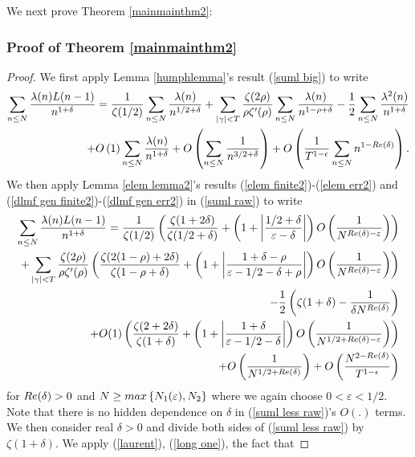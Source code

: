 \documentclass[11pt,article]{amsart}
\numberwithin{equation}{section}
\numberwithin{equation}{section}
\numberwithin{lemma}{section}
\numberwithin{prop}{section}
\begin{document}
We next prove Theorem \ref{mainmainthm2}:

\subsubsection{Proof of Theorem \ref{mainmainthm2}}
\begin{proof}
We first apply Lemma \ref{humphlemma}'s result (\ref{suml big}) to write
\begin{align}
\sum_{n\leq N}\frac{\lambda(n)L(n-1)}{n^{1+\delta}}=\frac{1}{\zeta(1/2)}\sum_{n\leq N}\frac{\lambda(n)}{n^{1/2+\delta}}+\sum_{\left|\gamma\right|<T}\frac{\zeta(2\rho)}{\rho\zeta'(\rho)}\sum_{n\leq N}\frac{\lambda(n)}{n^{1-\rho+\delta}}-\frac{1}{2}\sum_{n\leq N}\frac{\lambda^{2}(n)}{n^{1+\delta}} \nonumber \\
+O\left(1\right)\sum_{n\leq N}\frac{\lambda(n)}{n^{1+\delta}}+O\left(\sum_{n\leq N}\frac{1}{n^{3/2+\delta}}\right)+O\left(\frac{1}{T^{1-\epsilon}}\sum_{n\leq N}n^{1-\textnormal{Re}(\delta)}\right). \label{suml raw}
\end{align}
We then apply Lemma \ref{elem lemma2}'s results (\ref{elem finite2})-(\ref{elem err2}) and (\ref{dlmf gen finite2})-(\ref{dlmf gen err2}) in (\ref{suml raw}) to write
\begin{align}
\sum_{n\leq N}\frac{\lambda(n)L(n-1)}{n^{1+\delta}}=\frac{1}{\zeta(1/2)}\left(\frac{\zeta(1+2\delta)}{\zeta(1/2+\delta)}+\left(1+\left|\frac{1/2+\delta}{\varepsilon-\delta}\right|\right)O\left(\frac{1}{N^{\textnormal{Re}(\delta)-\varepsilon}}\right)\right) \nonumber \\ +\sum_{\left|\gamma\right|<T}\frac{\zeta(2\rho)}{\rho\zeta'(\rho)}\left(\frac{\zeta(2(1-\rho)+2\delta)}{\zeta(1-\rho+\delta)}+\left(1+\left|\frac{1+\delta-\rho}{\varepsilon-1/2-\delta+\rho}\right|\right)O\left(\frac{1}{N^{\textnormal{Re}(\delta)-\varepsilon}}\right)\right) \nonumber\\ -\frac{1}{2}\left(\zeta(1+\delta)-\frac{1}{\delta N^{\textnormal{Re}(\delta)}}\right) \nonumber\\ +O(1)\left(\frac{\zeta(2+2\delta)}{\zeta(1+\delta)}+\left(1+\left|\frac{1+\delta}{\varepsilon-1/2-\delta}\right|\right)O\left(\frac{1}{N^{1/2+\textnormal{Re}(\delta)-\varepsilon}}\right)\right) \nonumber \\
+O\left(\frac{1}{N^{1/2+\textnormal{Re}(\delta)}}\right)+O\left(\frac{N^{2-\textnormal{Re}(\delta)}}{T^{1-\epsilon}}\right)
\label{suml less raw}
\end{align}
for $\textnormal{Re}(\delta)>0$ and $N\geq \textnormal{max}\left\{N_{1}(\varepsilon),N_{2}\right\}$ where we again choose $0<\varepsilon<1/2$. Note that there is no hidden dependence on $\delta$ in (\ref{suml less raw})'s $O(.)$ terms. We then consider real $\delta>0$ and divide both sides of (\ref{suml less raw}) by $\zeta(1+\delta)$. We apply (\ref{laurent}), (\ref{long one}), the fact that 

\end{proof}
\end{document}
